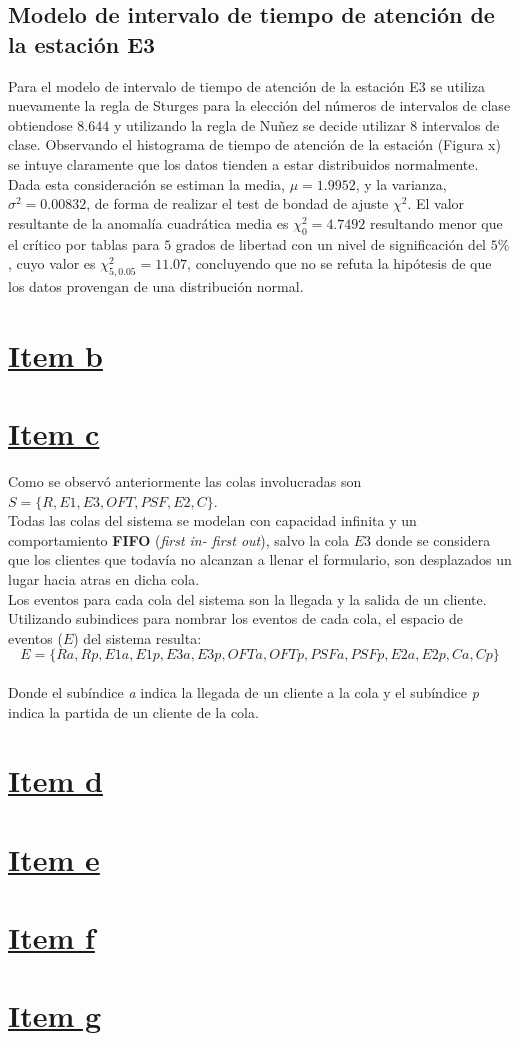 \documentclass[a4paper,10pt]{article}
\begin{document}
\subsection{Modelo de intervalo de tiempo de atenci\'on de la estaci\'on E3}
Para el modelo de intervalo de tiempo de atenci\'on de la estaci\'on E3 se
utiliza nuevamente la regla de Sturges para la elecci\'on del n\'umeros de
intervalos de clase obtiendose $8.644$ y utilizando la regla de Nu\~nez
se decide utilizar $8$ intervalos de clase.
Observando el histograma de tiempo de atenci\'on de la estaci\'on (Figura x)
se intuye claramente que los datos tienden a estar distribuidos normalmente.
Dada esta consideraci\'on se estiman la media, $\mu = 1.9952 $, y la varianza,
$\sigma^2 = 0.00832$, de forma de realizar el test de bondad de ajuste
$\chi^2$. El valor resultante de la anomal\'ia cuadr\'atica media es
$\chi_0^2 = 4.7492$ resultando menor que el cr\'itico por tablas para $5$
grados de libertad con un nivel de significaci\'on del $5\%$, cuyo valor es
$\chi_{5,0.05}^2 = 11.07$, concluyendo que no se refuta la hip\'otesis de que
los datos provengan de una distribuci\'on normal.

\section*{\underline{Item b}}
\section*{\underline{Item c}}
Como se observ\'o anteriormente las colas involucradas son
$S = \{R, E1, E3, OFT, PSF, E2, C\}$.\\
Todas las colas del sistema se modelan con capacidad infinita y un
comportamiento \textbf{FIFO} (\textit{first in- first out}), salvo la cola $E3$
donde se considera que los clientes que todav\'ia no alcanzan a llenar el
formulario, son desplazados un lugar hacia atras en dicha cola.\\
Los eventos para cada cola del sistema son la llegada y la salida de un cliente.
Utilizando subindices para nombrar los eventos de cada cola, el espacio de
eventos ($E$) del sistema resulta:\\
$$E = \{Ra , Rp , E1a , E1p , E3a , E3p , OFTa , OFTp , PSFa , PSFp , E2a , E2p , Ca , Cp \}$$\\
Donde el sub\'indice \textit{a} indica la llegada de un cliente a la cola y el
sub\'indice \textit{p} indica la partida de un cliente de la cola.

\section*{\underline{Item d}}
\section*{\underline{Item e}}
\section*{\underline{Item f}}
\section*{\underline{Item g}}
\end{document}
